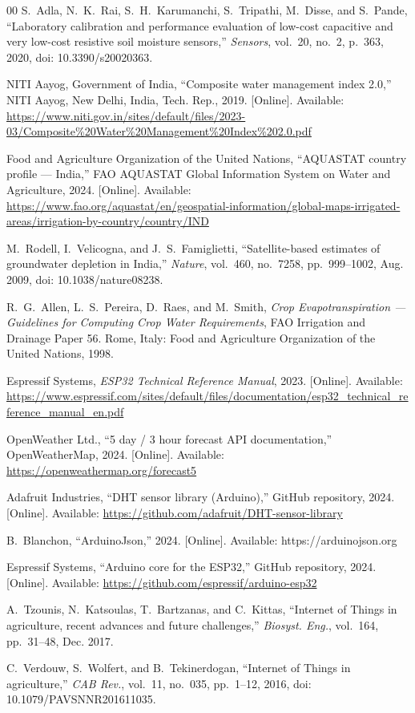 \documentclass[conference]{IEEEtran}
\begin{document}
\begin{thebibliography}{00}
 S.~Adla, N.~K.~Rai, S.~H.~Karumanchi, S.~Tripathi, M.~Disse, and S.~Pande, ``Laboratory calibration and performance evaluation of low-cost capacitive and very low-cost resistive soil moisture sensors,'' \emph{Sensors}, vol.~20, no.~2, p.~363, 2020, doi: 10.3390/s20020363.

 NITI Aayog, Government of India, ``Composite water management index 2.0,'' NITI Aayog, New Delhi, India, Tech. Rep., 2019. [Online]. Available: \url{https://www.niti.gov.in/sites/default/files/2023-03/Composite%20Water%20Management%20Index%202.0.pdf}

 Food and Agriculture Organization of the United Nations, ``AQUASTAT country profile --- India,'' FAO AQUASTAT Global Information System on Water and Agriculture, 2024. [Online]. Available: \url{https://www.fao.org/aquastat/en/geospatial-information/global-maps-irrigated-areas/irrigation-by-country/country/IND}

 M.~Rodell, I.~Velicogna, and J.~S.~Famiglietti, ``Satellite-based estimates of groundwater depletion in India,'' \emph{Nature}, vol.~460, no.~7258, pp.~999--1002, Aug. 2009, doi: 10.1038/nature08238.

 R.~G.~Allen, L.~S.~Pereira, D.~Raes, and M.~Smith, \emph{Crop Evapotranspiration --- Guidelines for Computing Crop Water Requirements}, FAO Irrigation and Drainage Paper 56. Rome, Italy: Food and Agriculture Organization of the United Nations, 1998.

 Espressif Systems, \emph{ESP32 Technical Reference Manual}, 2023. [Online]. Available: \url{https://www.espressif.com/sites/default/files/documentation/esp32_technical_reference_manual_en.pdf}

 OpenWeather Ltd., ``5 day / 3 hour forecast API documentation,'' OpenWeatherMap, 2024. [Online]. Available: \url{https://openweathermap.org/forecast5}

 Adafruit Industries, ``DHT sensor library (Arduino),'' GitHub repository, 2024. [Online]. Available: \url{https://github.com/adafruit/DHT-sensor-library}

 B.~Blanchon, ``ArduinoJson,'' 2024. [Online]. Available: https://arduinojson.org

 Espressif Systems, ``Arduino core for the ESP32,'' GitHub repository, 2024. [Online]. Available: \url{https://github.com/espressif/arduino-esp32}

 A.~Tzounis, N.~Katsoulas, T.~Bartzanas, and C.~Kittas, ``Internet of Things in agriculture, recent advances and future challenges,'' \emph{Biosyst. Eng.}, vol.~164, pp.~31--48, Dec. 2017.

 C.~Verdouw, S.~Wolfert, and B.~Tekinerdogan, ``Internet of Things in agriculture,'' \emph{CAB Rev.}, vol.~11, no.~035, pp.~1--12, 2016, doi: 10.1079/PAVSNNR201611035.

\end{thebibliography}
\end{document}
